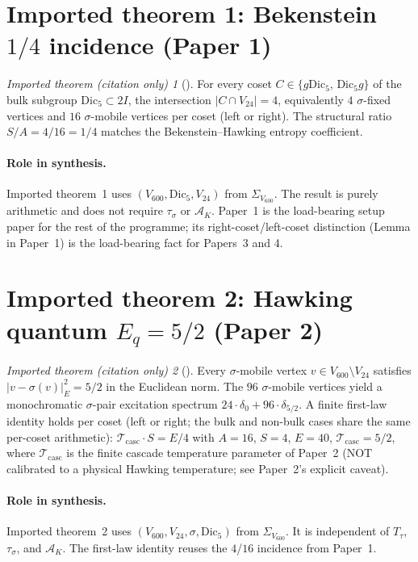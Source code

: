 \documentclass[11pt]{article}
\theoremstyle{remark}
\newtheorem*{importedTheorem}{Imported theorem (citation only)}
\newcommand{\twoI}{2I}
\newcommand{\Vsixhundred}{V_{600}}
\newcommand{\Dicfive}{\mathrm{Dic}_5}
\newcommand{\Vtwentyfour}{V_{24}}
\newcommand{\Sigmaspine}{\Sigma_{\Vsixhundred}}
\newcommand{\Ttau}{T_{\tau}}
\newcommand{\sigmaG}{\sigma}
\newcommand{\tausigma}{\tau_\sigma}
\newcommand{\AK}{\mathcal{A}_K}
\begin{document}
\section{Imported theorem 1: Bekenstein \texorpdfstring{$1/4$}{1/4}
incidence (Paper 1)}\label{sec:p1}

\begin{importedTheorem}[\citealp{V600Paper1}]
For every coset $C \in \{g\Dicfive,\, \Dicfive g\}$ of the bulk
subgroup $\Dicfive \subset \twoI$, the intersection
$|C \cap \Vtwentyfour| = 4$, equivalently $4$
$\sigmaG$-fixed vertices and $16$ $\sigmaG$-mobile vertices per
coset (left or right). The structural ratio $S/A = 4/16 = 1/4$
matches the Bekenstein--Hawking entropy coefficient.
\end{importedTheorem}

\paragraph{Role in synthesis.}
Imported theorem~1 uses $(\Vsixhundred, \Dicfive, \Vtwentyfour)$
from $\Sigmaspine$. The result is purely arithmetic and does not
require $\tausigma$ or $\AK$. Paper~1 is the load-bearing setup
paper for the rest of the programme; its right-coset/left-coset
distinction (Lemma in Paper~1) is the load-bearing fact for
Papers~3 and 4.

\section{Imported theorem 2: Hawking quantum $E_q = 5/2$ (Paper 2)}\label{sec:p2}

\begin{importedTheorem}[\citealp{V600Paper2}]
Every $\sigmaG$-mobile vertex $v \in \Vsixhundred \setminus \Vtwentyfour$
satisfies $|v - \sigmaG(v)|_E^2 = 5/2$ in the Euclidean norm. The
$96$ $\sigmaG$-mobile vertices yield a monochromatic $\sigmaG$-pair
excitation spectrum $24 \cdot \delta_0 + 96 \cdot \delta_{5/2}$.
A finite first-law identity holds per coset (left or right; the bulk
and non-bulk cases share the same per-coset arithmetic):
$\mathcal{T}_{\mathrm{casc}} \cdot S = E/4$ with $A = 16$, $S = 4$,
$E = 40$, $\mathcal{T}_{\mathrm{casc}} = 5/2$, where
$\mathcal{T}_{\mathrm{casc}}$ is the finite cascade temperature
parameter of Paper~2 (NOT calibrated to a physical Hawking
temperature; see Paper~2's explicit caveat).
\end{importedTheorem}

\paragraph{Role in synthesis.}
Imported theorem~2 uses $(\Vsixhundred, \Vtwentyfour, \sigmaG,
\Dicfive)$ from $\Sigmaspine$. It is independent of $\Ttau$,
$\tausigma$, and $\AK$. The first-law identity reuses the $4$/$16$
incidence from Paper~1.
\end{document}
